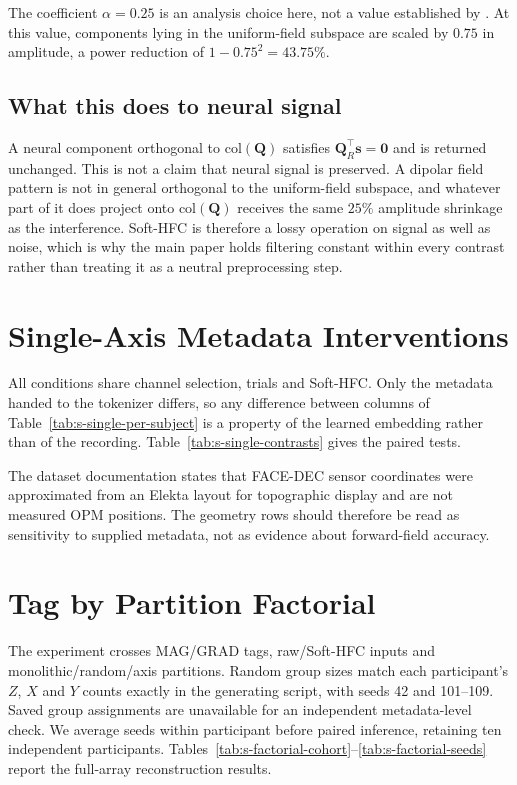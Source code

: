 \documentclass[letterpaper]{article}
\begin{document}
The coefficient $\alpha = 0.25$ is an analysis choice here, not a value established by \citet{tierney2021hfc}. At this value, components lying in the uniform-field subspace
are scaled by $0.75$ in amplitude, a power reduction of $1 - 0.75^{2} = 43.75\%$.

\subsection{What this does to neural signal}
A neural component orthogonal to $\mathrm{col}(\mathbf{Q})$ satisfies
$\mathbf{Q}_{R}^{\top}\mathbf{s} = \mathbf{0}$ and is returned unchanged. This is not a
claim that neural signal is preserved. A dipolar field pattern is not in general
orthogonal to the uniform-field subspace, and whatever part of it does project onto
$\mathrm{col}(\mathbf{Q})$ receives the same $25\%$ amplitude shrinkage as the
interference. Soft-HFC is therefore a lossy operation on signal as well as noise,
which is why the main paper holds filtering constant within every contrast rather
than treating it as a neutral preprocessing step.

\section{Single-Axis Metadata Interventions}

All conditions share channel selection, trials and Soft-HFC. Only the metadata handed
to the tokenizer differs, so any difference between columns of
Table~\ref{tab:s-single-per-subject} is a property of the learned embedding rather than
of the recording. Table~\ref{tab:s-single-contrasts} gives the paired tests.

The dataset documentation states that FACE-DEC sensor coordinates were approximated
from an Elekta layout for topographic display and are not measured OPM positions. The
geometry rows should therefore be read as sensitivity to supplied metadata, not as
evidence about forward-field accuracy.

\section{Tag by Partition Factorial}
The experiment crosses MAG/GRAD tags, raw/Soft-HFC inputs and monolithic/random/axis partitions. Random group sizes match each participant's $Z$, $X$ and $Y$ counts exactly in the generating script, with seeds 42 and 101--109. Saved group assignments are unavailable for an independent metadata-level check. We average seeds within participant before paired inference, retaining ten independent participants. Tables~\ref{tab:s-factorial-cohort}--\ref{tab:s-factorial-seeds} report the full-array reconstruction results.
\end{document}
